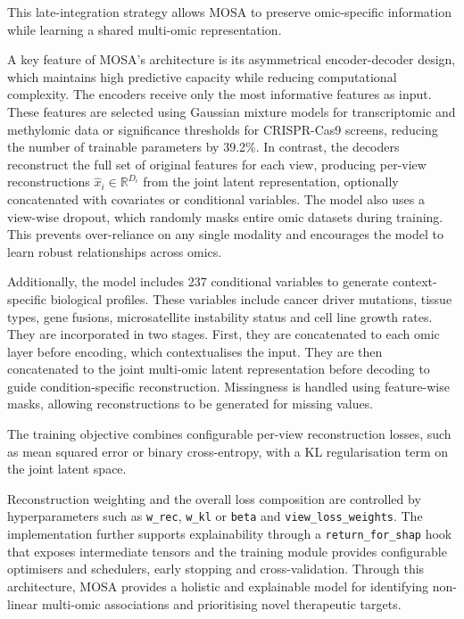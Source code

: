 This late-integration strategy allows MOSA to preserve omic-specific information while learning a shared multi-omic representation.

A key feature of MOSA's architecture is its asymmetrical encoder-decoder design, which maintains high predictive capacity while reducing computational complexity. The encoders receive only the most informative features as input. These features are selected using Gaussian mixture models for transcriptomic and methylomic data or significance thresholds for \gls{CRISPR}-Cas9 screens, reducing the number of trainable parameters by 39.2\%. In contrast, the decoders reconstruct the full set of original features for each view, producing per-view reconstructions $\hat{x}_i \in \mathbb{R}^{D_i}$ from the joint latent representation, optionally concatenated with covariates or conditional variables. The model also uses a view-wise dropout, which randomly masks entire omic datasets during training. This prevents over-reliance on any single modality and encourages the model to learn robust relationships across omics.

Additionally, the model includes 237 conditional variables to generate context-specific biological profiles. These variables include cancer driver mutations, tissue types, gene fusions, microsatellite instability status and cell line growth rates. They are incorporated in two stages. First, they are concatenated to each omic layer before encoding, which contextualises the input. They are then concatenated to the joint multi-omic latent representation before decoding to guide condition-specific reconstruction. Missingness is handled using feature-wise masks, allowing reconstructions to be generated for missing values.

The training objective combines configurable per-view reconstruction losses, such as mean squared error or binary cross-entropy, with a KL regularisation term on the joint latent space.

Reconstruction weighting and the overall loss composition are controlled by hyperparameters such as \texttt{w\_rec}, \texttt{w\_kl} or \texttt{beta} and \texttt{view\_loss\_weights}. The implementation further supports explainability through a \texttt{return\_for\_shap} hook that exposes intermediate tensors and the training module provides configurable optimisers and schedulers, early stopping and cross-validation. Through this architecture, MOSA provides a holistic and explainable model for identifying non-linear multi-omic associations and prioritising novel therapeutic targets.